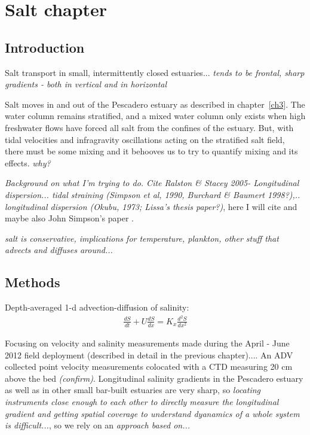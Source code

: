 \chapter{Salt chapter}
\label{chSalt}


\section{Introduction}
Salt transport in small, intermittently closed estuaries... \emph{tends to be frontal, sharp gradients - both in vertical and in horizontal}

Salt moves in and out of the Pescadero estuary as described in chapter~\ref{ch3}. The water column remains stratified, and a mixed water column only exists when high freshwater flows have forced all salt from the confines of the estuary. But, with tidal velocities and infragravity oscillations acting on the stratified salt field, there must be some mixing and it behooves us to try to quantify mixing and its effects. \emph{why?}



\emph{Background on what I'm trying to do.  Cite Ralston \& Stacey 2005- Longitudinal dispersion... tidal straining (Simpson et al, 1990, Burchard \& Baumert 1998?),.. longitudinal dispersion (Okubu, 1973; Lissa's thesis paper?)}, here I will cite \cite{Ralston:2005aa} and maybe also John Simpson's paper \cite{Simpson:1990aa}. 

\emph{salt is conservative, implications for temperature, plankton, other stuff that advects and diffuses around...}



\section{Methods}

Depth-averaged 1-d advection-diffusion of salinity:
\begin{eqnarray}
\frac{dS}{dt} + U\frac{dS}{dx} = K_x\frac{d^2S}{dx^2} \label{eq:1dadvdiff}
\end{eqnarray}


Focusing on velocity and salinity measurements made during the April - June 2012 field deployment (described in detail in the previous chapter).... An ADV collected point velocity measurements colocated with a CTD measuring 20 cm above the bed \emph{(confirm)}. Longitudinal salinity gradients in the Pescadero estuary as well as in other small bar-built estuaries are very sharp, so \emph{locating instruments close enough to each other to directly measure the longitudinal gradient and getting spatial coverage to understand dyanamics of a whole system is difficult...}, so we rely on an \emph{approach based on...}


